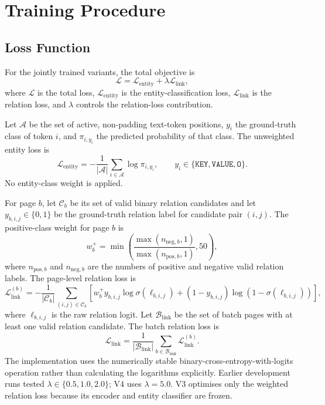 \section{Training Procedure}
\label{sec:training-procedure}

\subsection{Loss Function}
\label{sec:loss-function}

For the jointly trained variants, the total objective is
\begin{equation}
  \label{eq:joint-loss}
  \mathcal{L}
  =\mathcal{L}_{\mathrm{entity}}
  +\lambda\mathcal{L}_{\mathrm{link}},
\end{equation}
where $\mathcal{L}$ is the total loss,
$\mathcal{L}_{\mathrm{entity}}$ is the entity-classification loss,
$\mathcal{L}_{\mathrm{link}}$ is the relation loss, and $\lambda$ controls
the relation-loss contribution.

Let $\mathcal{A}$ be the set of active, non-padding text-token positions,
$y_i$ the ground-truth class of token $i$, and $\pi_{i,y_i}$ the predicted
probability of that class. The unweighted entity loss is
\[
  \mathcal{L}_{\mathrm{entity}}
  =-\frac{1}{|\mathcal{A}|}
   \sum_{i\in\mathcal{A}}\log\pi_{i,y_i},
  \qquad
  y_i\in\{\texttt{KEY},\texttt{VALUE},\texttt{O}\}.
\]
No entity-class weight is applied.

For page $b$, let $\mathcal{C}_b$ be its set of valid binary relation
candidates and let $y_{b,i,j}\in\{0,1\}$ be the ground-truth relation label
for candidate pair $(i,j)$. The positive-class weight for page $b$ is
\[
  w_b^{+}
  =\min\!\left(
    \frac{\max(n_{\mathrm{neg},b},1)}
         {\max(n_{\mathrm{pos},b},1)},
    50
  \right),
\]
where $n_{\mathrm{pos},b}$ and $n_{\mathrm{neg},b}$ are the numbers of
positive and negative valid relation labels. The page-level relation loss is
\[
  \mathcal{L}_{\mathrm{link}}^{(b)}
  =-\frac{1}{|\mathcal{C}_b|}
   \sum_{(i,j)\in\mathcal{C}_b}
   \left[
     w_b^{+}y_{b,i,j}\log\sigma(\ell_{b,i,j})
     +(1-y_{b,i,j})
      \log\!\left(1-\sigma(\ell_{b,i,j})\right)
   \right],
\]
where $\ell_{b,i,j}$ is the raw relation logit. Let
$\mathcal{B}_{\mathrm{link}}$ be the set of batch pages with at least one
valid relation candidate. The batch relation loss is
\[
  \mathcal{L}_{\mathrm{link}}
  =\frac{1}{|\mathcal{B}_{\mathrm{link}}|}
   \sum_{b\in\mathcal{B}_{\mathrm{link}}}
   \mathcal{L}_{\mathrm{link}}^{(b)}.
\]
The implementation uses the numerically stable
binary-cross-entropy-with-logits operation rather than calculating the
logarithms explicitly. Earlier development runs tested
$\lambda\in\{0.5,1.0,2.0\}$; V4 uses $\lambda=5.0$. V3 optimises only the
weighted relation loss because its encoder and entity classifier are frozen.

